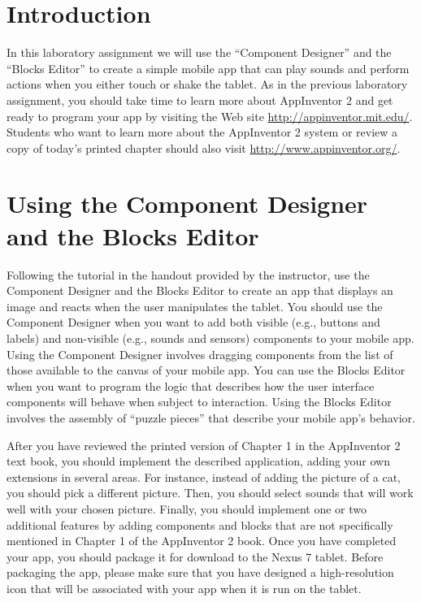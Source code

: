 	

\usepackage[compact]{titlesec}



\vspace*{-.1in}
\section*{Introduction}

In this laboratory assignment we will use the ``Component Designer'' and the ``Blocks Editor'' to create a simple mobile
app that can play sounds and perform actions when you either touch or shake the tablet.  As in the previous laboratory
assignment, you should take time to learn more about AppInventor 2 and get ready to program your app by visiting the Web
site \url{http://appinventor.mit.edu/}. Students who want to learn more about the AppInventor 2 system or review a copy
of today's printed chapter should also visit \url{http://www.appinventor.org/}.

\section*{Using the Component Designer and the Blocks Editor}

Following the tutorial in the handout provided by the instructor, use the Component Designer and the Blocks Editor
to create an app that displays an image and reacts when the user manipulates the tablet.  You should use the Component
Designer when you want to add both visible (e.g., buttons and labels) and non-visible (e.g., sounds and sensors)
components to your mobile app.  Using the Component Designer involves dragging components from the list of those
available to the canvas of your mobile app.  You can use the Blocks Editor when you want to program the logic that
describes how the user interface components will behave when subject to interaction. Using the Blocks Editor involves
the assembly of ``puzzle pieces'' that describe your mobile app's behavior.

After you have reviewed the printed version of Chapter 1 in the AppInventor 2 text book, you should implement the
described application, adding your own extensions in several areas.  For instance, instead of adding the picture of a
cat, you should pick a different picture.  Then, you should select sounds that will work well with your chosen picture.
Finally, you should implement one or two additional features by adding components and blocks that are not specifically
mentioned in Chapter 1 of the AppInventor 2 book. Once you have completed your app, you should package it for download to
the Nexus 7 tablet.  Before packaging the app, please make sure that you have designed a high-resolution icon that will
be associated with your app when it is run on the tablet.

